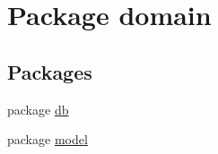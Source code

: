 \hypertarget{namespacedomain}{}\section{Package domain}
\label{namespacedomain}
\subsection*{Packages}
\begin{DoxyCompactItemize}
\item 
package \mbox{\hyperlink{namespacedomain_1_1db}{db}}
\item 
package \mbox{\hyperlink{namespacedomain_1_1model}{model}}
\end{DoxyCompactItemize}
